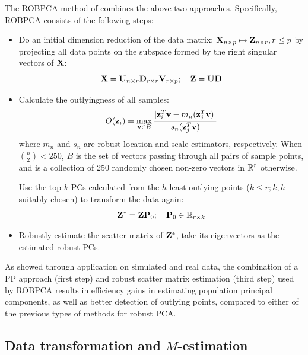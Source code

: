The ROBPCA method of \cite{hubert05} combines the above two approaches. Specifically, ROBPCA consists of the following steps:
%
\begin{itemize}
\item Do an initial dimension reduction of the data matrix: ${\mathbf{X}}_{n \times p} \mapsto {\mathbf{Z}}_{n \times r}, r \leq p$ by projecting all data points on the subspace formed by the right singular vectors of ${\mathbf{X}}$:
%
$$
{\mathbf{X}} = {\mathbf{U}}_{n \times r} {\mathbf{D}}_{r \times r} {\mathbf{V}}_{r \times p}; \quad
{\mathbf{Z}} = {\mathbf{U}} {\mathbf{D}}
$$

\item Calculate the outlyingness of all samples:
%
$$
O({\bf{z}}_i) = \max_{{\bf{v}} \in B} \frac{| {\bf{z}}_i^T {\bf{v}} - m_n ({\bf{z}}_j^T {\bf{v}})|}{s_n ({\bf{z}}_j^T {\bf{v}} )}
$$
%
where $m_n$ and $s_n$ are robust location and scale estimators, respectively. When $\binom{n}{2} < 250$, $B$ is the set of vectors passing through all pairs of sample points, and is a collection of 250 randomly chosen non-zero vectors in ${\mathbb{R}}^{r}$ otherwise.

Use the top $k$ PCs calculated from the $h$ least outlying points ($k \leq r; k, h$ suitably chosen) to transform the data again:
%
$$
{\mathbf{Z}}^* =  {\mathbf{Z}} {\mathbf{P}}_0; \quad {\mathbf{P}}_0 \in {\mathbb{R}}_{r \times k}
$$


\item Robustly estimate the scatter matrix of ${\mathbf{Z}}^*$, take its eigenvectors as the estimated robust PCs.
\end{itemize}

As \cite{hubert05} showed through application on simulated and real data, the combination of a PP approach (first step) and robust scatter matrix estimation (third step) used by ROBPCA results in efficiency gains in estimating population principal components, as well as better detection of outlying points, compared to either of the previous types of methods for robust PCA.

\subsection{Data transformation and $M$-estimation}

